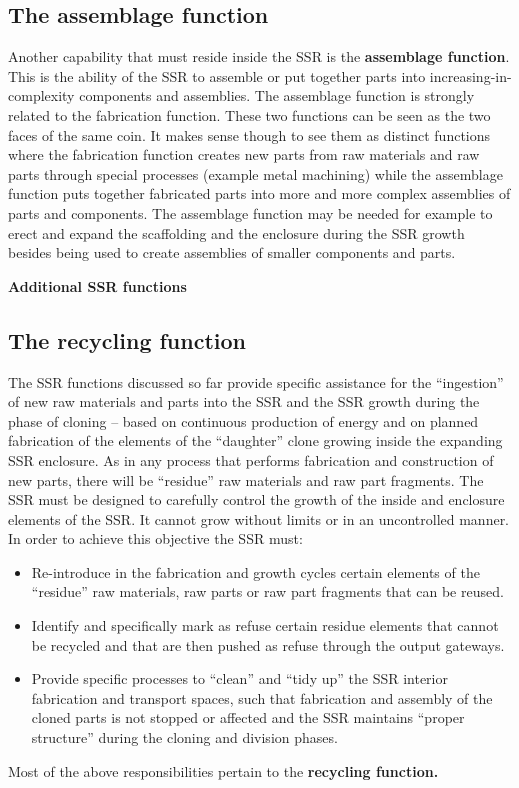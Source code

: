 \documentclass[letterpaper]{article}
\begin{document}
\subsection[The assemblage function]{The assemblage function}
\hypertarget{RefHeading3076306210128}{}Another capability that must
reside inside the SSR is the \textbf{assemblage function}. This is the
ability of the SSR to assemble or put together parts into
increasing-in-complexity components and assemblies. The assemblage
function is strongly related to the fabrication function. These two
functions can be seen as the two faces of the same coin. It makes sense
though to see them as distinct functions where the fabrication function
creates new parts from raw materials and raw parts through special
processes (example metal machining) while the assemblage function puts
together fabricated parts into more and more complex assemblies of
parts and components. The assemblage function may be needed for example
to erect and expand the scaffolding and the enclosure during the SSR
growth besides being used to create assemblies of smaller components
and parts.


\bigskip


\bigskip

{\bfseries
\hypertarget{RefHeading3078306210128}{}Additional SSR functions}

\subsection[The recycling function]{The recycling function}
\hypertarget{RefHeading3080306210128}{}The SSR functions discussed so
far provide specific assistance for the “ingestion” of new raw
materials and parts into the SSR and the SSR growth during the phase of
cloning – based on continuous production of energy and on planned
fabrication of the elements of the “daughter” clone growing inside the
expanding SSR enclosure. As in any process that performs fabrication
and construction of new parts, there will be “residue” raw materials
and raw part fragments.  The SSR must be designed to carefully control
the growth of the inside and enclosure elements of the SSR. It cannot
grow without limits or in an uncontrolled manner. In order to achieve
this objective the SSR must:


\bigskip

\begin{itemize}
\item Re-introduce in the fabrication and growth cycles certain elements
of the “residue” raw materials, raw parts or raw part fragments that
can be reused.
\item Identify and specifically mark as refuse certain residue elements
that cannot be recycled and that are then pushed as refuse through the
output gateways.
\item Provide specific processes to “clean” and “tidy up” the SSR
interior fabrication and transport spaces, such that fabrication and
assembly of the cloned parts is not stopped or affected and the SSR
maintains “proper structure” during the cloning and division phases.
\end{itemize}
Most of the above responsibilities pertain to the \textbf{recycling
function.}
\end{document}
